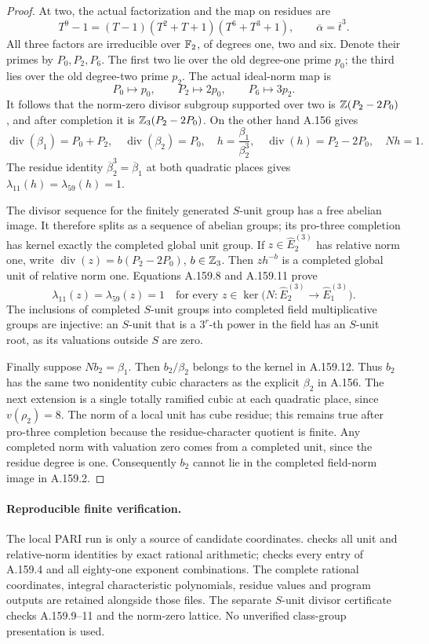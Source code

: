 \begin{proof}
At two, the actual factorization and the map on residues are
\[
 T^9-1=(T-1)(T^2+T+1)(T^6+T^3+1),\qquad
 \overline\alpha=\overline t^{3}.
\tag{A.159.9}
\]
All three factors are irreducible over \(\mathbb F_2\), of degrees one, two
and six.  Denote their primes by \(P_0,P_2,P_6\).
The first two lie over the old degree-one prime \(p_0\); the third
lies over the old degree-two prime \(p_2\).  The actual ideal-norm map is
\[
 P_0\longmapsto p_0,\qquad
 P_2\longmapsto2p_0,\qquad
 P_6\longmapsto3p_2.
\tag{A.159.10}
\]
It follows that the norm-zero divisor subgroup supported over two is
\(\mathbb Z(P_2-2P_0)\), and after completion it is
\(\mathbb Z_3(P_2-2P_0)\).
On the other hand A.156 gives
\[
 \operatorname{div}(\beta_1)=P_0+P_2,\quad
 \operatorname{div}(\beta_2)=P_0,\quad
 h=\frac{\beta_1}{\beta_2^3},\quad
 \operatorname{div}(h)=P_2-2P_0,\quad Nh=1.
\tag{A.159.11}
\]
The residue identity \(\overline\beta_2^{3}=
\overline\beta_1\) at both quadratic places gives
\(\lambda_{11}(h)=\lambda_{59}(h)=1\).

The divisor sequence for the finitely generated $S$-unit group has a
free abelian image.  It therefore splits as a sequence of abelian groups;
its pro-three completion has kernel exactly the completed global unit
group.  If \(z\in\widehat E_2^{(3)}\) has relative norm one, write
\(\operatorname{div}(z)=b(P_2-2P_0)\), \(b\in\mathbb Z_3\).
Then \(zh^{-b}\) is a completed global unit of relative norm one.
Equations A.159.8 and A.159.11 prove
\[
 \lambda_{11}(z)=\lambda_{59}(z)=1
 \quad\text{for every }z\in
 \ker\bigl(N:\widehat E_2^{(3)}\to\widehat E_1^{(3)}\bigr).
\tag{A.159.12}
\]
The inclusions of completed $S$-unit groups into completed field
multiplicative groups are injective: an $S$-unit that is a \(3^r\)-th
power in the field has an $S$-unit root, as its valuations outside $S$
are zero.

Finally suppose \(Nb_2=\beta_1\).  Then
\(b_2/\beta_2\) belongs to the kernel in A.159.12.  Thus \(b_2\)
has the same two nonidentity cubic characters as the explicit
\(\beta_2\) in A.156.  The next extension is a single totally ramified
cubic at each quadratic place, since \(v(\rho_2)=8\).
The norm of a local unit has cube residue; this remains true after
pro-three completion because the residue-character quotient is finite.
Any completed norm with valuation zero comes from a completed unit,
since the residue degree is one.  Consequently \(b_2\) cannot lie in
the completed field-norm image in A.159.2.
\end{proof}

\paragraph{Reproducible finite verification.}
The local PARI run is only a source of candidate coordinates.
checks all unit and relative-norm identities by exact rational arithmetic;
checks every entry of A.159.4 and all eighty-one exponent combinations.
The complete rational coordinates, integral characteristic polynomials,
residue values and program outputs are retained alongside those files.
The separate $S$-unit divisor certificate checks A.159.9--11 and the
norm-zero lattice.  No unverified class-group presentation is used.
